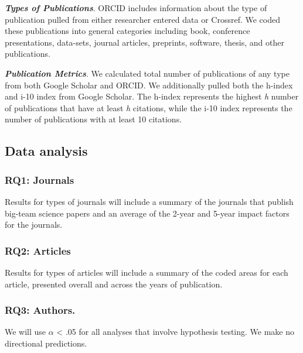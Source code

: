 \documentclass[
  english,
  man]{apa6}
\begin{document}
\textbf{\emph{Types of Publications}}. ORCID includes information about the type of publication pulled from either researcher entered data or Crossref. We coded these publications into general categories including book, conference presentations, data-sets, journal articles, preprints, software, thesis, and other publications.

\textbf{\emph{Publication Metrics}}. We calculated total number of publications of any type from both Google Scholar and ORCID. We additionally pulled both the h-index and i-10 index from Google Scholar. The h-index represents the highest \emph{h} number of publications that have at least \emph{h} citations, while the i-10 index represents the number of publications with at least 10 citations.

\hypertarget{data-analysis}{%
\subsection{Data analysis}\label{data-analysis}}

\hypertarget{rq1-journals}{%
\subsubsection{RQ1: Journals}\label{rq1-journals}}

Results for types of journals will include a summary of the journals that publish big-team science papers and an average of the 2-year and 5-year impact factors for the journals.

\hypertarget{rq2-articles}{%
\subsubsection{RQ2: Articles}\label{rq2-articles}}

Results for types of articles will include a summary of the coded areas for each article, presented overall and across the years of publication.

\hypertarget{rq3-authors.}{%
\subsubsection{\texorpdfstring{RQ3: Authors.\\
}{RQ3: Authors. }}\label{rq3-authors.}}

We will use \(\alpha\) \textless{} .05 for all analyses that involve hypothesis testing. We make no directional predictions.
\end{document}
